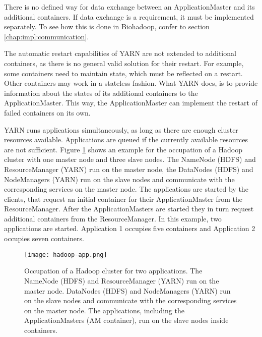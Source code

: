 There is no defined way for data exchange between an ApplicationMaster and its additional containers. If data exchange is a requirement, it must be implemented separately. To see how this is done in Biohadoop, confer to section \ref{chap:impl:communication}.

The automatic restart capabilities of YARN are not extended to additional containers, as there is no general valid solution for their restart. For example, some containers need to maintain state, which must be reflected on a restart. Other containers may work in a stateless fashion. What YARN does, is to provide information about the states of its additional containers to the ApplicationMaster. This way, the ApplicationMaster can implement the restart of failed containers on its own.

YARN runs applications simultaneously, as long as there are enough cluster resources available. Applications are queued if the currently available resources are not sufficient. Figure \ref{fig:hadoop-app} shows an example for the occupation of a Hadoop cluster with one master node and three slave nodes. The NameNode (HDFS) and ResourceManager (YARN) run on the master node, the DataNodes (HDFS) and NodeManagers (YARN) run on the slave nodes and communicate with the corresponding services on the master node. The applications are started by the clients, that request an initial container for their ApplicationMaster from the ResourceManager. After the ApplicationMasters are started they in turn request additional containers from the ResourceManager. In this example, two applications are started. Application 1 occupies five containers and Application 2 occupies seven containers.

\begin{figure}
  \centering
  \texttt{[image: hadoop-app.png]}
  \caption[Occupation of a Hadoop cluster for two applications]{Occupation of a Hadoop cluster for two applications. The NameNode (HDFS) and ResourceManager (YARN) run on the master node. DataNodes (HDFS) and NodeManagers (YARN) run on the slave nodes and communicate with the corresponding services on the master node. The applications, including the ApplicationMasters (AM container), run on the slave nodes inside containers.}
  \label{fig:hadoop-app}
\end{figure}
